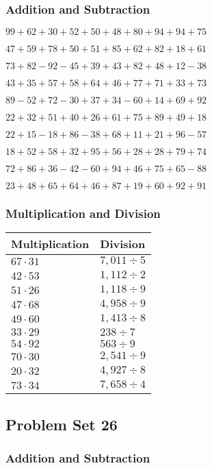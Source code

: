 \hypertarget{addition-and-subtraction-65}{%
\subsubsection{Addition and
Subtraction}\label{addition-and-subtraction-65}}

\(99+62+30+52+50+48+80+94+94+ 75\)

\(47+59+78+50+51+85+62+82+18+61\)

\(73+82-92-45+39+43+82+48+12-38\)

\(43+35+57+58+64+46+77+71+33+73\)

\(89-52+72-30+37+34-60+14+69+92\)

\(22+32+51+40+26+61+75+89+49+18\)

\(22+15-18+86-38+68+11+21+96-57\)

\(18+52+58+32+95+56+28+28+79+74\)

\(72+86+36-42-60+94+46+75+65-88\)

\(23+48+65+64+46+87+19+60+92+91\)

\hypertarget{multiplication-and-division-65}{%
\subsubsection{Multiplication and
Division}\label{multiplication-and-division-65}}

\begin{longtable}[]{@{}ll@{}}
\toprule
Multiplication & Division\tabularnewline
\midrule
\endhead
\(67\cdot31\) & \(7,011÷5\)\tabularnewline
\(42\cdot53\) & \(1,112÷2\)\tabularnewline
\(51\cdot26\) & \(1,118÷9\)\tabularnewline
\(47\cdot68\) & \(4,958÷9\)\tabularnewline
\(49\cdot60\) & \(1,413÷8\)\tabularnewline
\(33\cdot29\) & \(238÷7\)\tabularnewline
\(54\cdot92\) & \(563÷9\)\tabularnewline
\(70\cdot30\) & \(2,541 ÷9\)\tabularnewline
\(20\cdot32\) & \(4,927÷8\)\tabularnewline
\(73\cdot34\) & \(7,658÷4\)\tabularnewline
\bottomrule
\end{longtable}

\hypertarget{problem-set-26-1}{%
\subsection{Problem Set 26}\label{problem-set-26-1}}

\hypertarget{addition-and-subtraction-66}{%
\subsubsection{Addition and
Subtraction}\label{addition-and-subtraction-66}}

